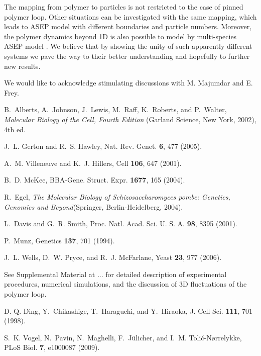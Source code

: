 \documentclass[aps,showpacs,twocolumn,floatfix,prx,superscriptaddress]{revtex4-1}
\begin{document}
The mapping from polymer to particles is not restricted to the case of pinned polymer loop. Other situations can be investigated with the same mapping, which leads to ASEP model with different boundaries and particle numbers. Moreover, the polymer dynamics beyond 1D is also possible to
model by multi-species ASEP model \cite{}. We believe that by showing the unity of such apparently different systems we pave the way to their better understanding and hopefully to further new results.
\begin{acknowledgments}
We would like to acknowledge stimulating discussions with M. Majumdar and E. Frey.\end{acknowledgments}

%

\begin{thebibliography}{10}


B.~Alberts,
  A.~Johnson,
  J.~Lewis,
  M.~Raff,
  K.~Roberts, and
  P.~Walter,
  \emph{Molecular Biology of the Cell, Fourth Edition}
  (Garland Science, New York, 2002),
  4th ed.

J.~L. Gerton and
  R.~S. Hawley,
  Nat. Rev. Genet. \textbf{6},
  477 (2005).

A.~M. Villeneuve
  and K.~J.
  Hillers, Cell
  \textbf{106}, 647 (2001).

B.~D. McKee,
  BBA-Gene. Struct. Expr. \textbf{1677}, 165 
  (2004).

R.~Egel,
  \emph{The Molecular Biology of Schizosaccharomyces pombe:
  Genetics, Genomics and Beyond}(Springer, Berlin-Heidelberg,
  2004).

L.~Davis and
  G.~R. Smith,
  Proc. Natl. Acad. Sci. U. S. A.
  \textbf{98}, 8395 (2001).

P.~Munz,
  Genetics \textbf{137},
  701 (1994).

J.~L. Wells,
  D.~W. Pryce, and
  R.~J. McFarlane,
  Yeast \textbf{23}, 977
  (2006).
  
  See Supplemental Material at ... for detailed description of experimental procedures, numerical simulations, and the discussion of 3D fluctuations of the polymer loop.

D.-Q. Ding,
  Y.~Chikashige,
  T.~Haraguchi,
  and Y.~Hiraoka,
  J. Cell Sci. \textbf{111},
  701 (1998).

S.~K. Vogel,
  N.~Pavin,
  N.~Maghelli,
  F.~J\"ulicher,
  and I.~M.
  Toli\'c-N\o rrelykke, PLoS Biol.
  \textbf{7}, e1000087
  (2009).


\end{thebibliography}
\end{document}

